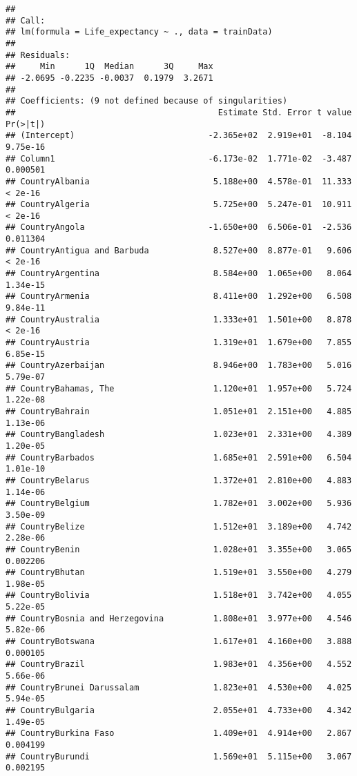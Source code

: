 \documentclass[
]{article}
\begin{document}
\begin{verbatim}
## 
## Call:
## lm(formula = Life_expectancy ~ ., data = trainData)
## 
## Residuals:
##     Min      1Q  Median      3Q     Max 
## -2.0695 -0.2235 -0.0037  0.1979  3.2671 
## 
## Coefficients: (9 not defined because of singularities)
##                                         Estimate Std. Error t value Pr(>|t|)
## (Intercept)                           -2.365e+02  2.919e+01  -8.104 9.75e-16
## Column1                               -6.173e-02  1.771e-02  -3.487 0.000501
## CountryAlbania                         5.188e+00  4.578e-01  11.333  < 2e-16
## CountryAlgeria                         5.725e+00  5.247e-01  10.911  < 2e-16
## CountryAngola                         -1.650e+00  6.506e-01  -2.536 0.011304
## CountryAntigua and Barbuda             8.527e+00  8.877e-01   9.606  < 2e-16
## CountryArgentina                       8.584e+00  1.065e+00   8.064 1.34e-15
## CountryArmenia                         8.411e+00  1.292e+00   6.508 9.84e-11
## CountryAustralia                       1.333e+01  1.501e+00   8.878  < 2e-16
## CountryAustria                         1.319e+01  1.679e+00   7.855 6.85e-15
## CountryAzerbaijan                      8.946e+00  1.783e+00   5.016 5.79e-07
## CountryBahamas, The                    1.120e+01  1.957e+00   5.724 1.22e-08
## CountryBahrain                         1.051e+01  2.151e+00   4.885 1.13e-06
## CountryBangladesh                      1.023e+01  2.331e+00   4.389 1.20e-05
## CountryBarbados                        1.685e+01  2.591e+00   6.504 1.01e-10
## CountryBelarus                         1.372e+01  2.810e+00   4.883 1.14e-06
## CountryBelgium                         1.782e+01  3.002e+00   5.936 3.50e-09
## CountryBelize                          1.512e+01  3.189e+00   4.742 2.28e-06
## CountryBenin                           1.028e+01  3.355e+00   3.065 0.002206
## CountryBhutan                          1.519e+01  3.550e+00   4.279 1.98e-05
## CountryBolivia                         1.518e+01  3.742e+00   4.055 5.22e-05
## CountryBosnia and Herzegovina          1.808e+01  3.977e+00   4.546 5.82e-06
## CountryBotswana                        1.617e+01  4.160e+00   3.888 0.000105
## CountryBrazil                          1.983e+01  4.356e+00   4.552 5.66e-06
## CountryBrunei Darussalam               1.823e+01  4.530e+00   4.025 5.94e-05
## CountryBulgaria                        2.055e+01  4.733e+00   4.342 1.49e-05
## CountryBurkina Faso                    1.409e+01  4.914e+00   2.867 0.004199
## CountryBurundi                         1.569e+01  5.115e+00   3.067 0.002195

\end{verbatim}
\end{document}
